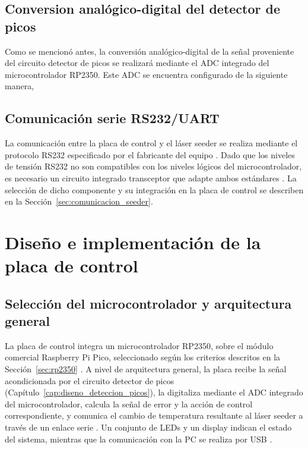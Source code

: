 \section {Conversion analógico-digital del detector de picos}
\label{sec:conversion_adc}

Como se mencionó antes, la conversión analógico-digital de la señal proveniente del circuito detector de picos se realizará mediante el ADC integrado del microcontrolador RP2350. Este ADC se encuentra configurado de la siguiente manera,

\section{Comunicaci\'on serie RS232/UART}
\label{sec:rs232_uart}

La comunicaci\'on entre la placa de control y el l\'aser seeder se
realiza mediante el protocolo RS232 especificado por el fabricante del
equipo \cite{informeMarzo2026}. Dado que los niveles de tensi\'on RS232
no son compatibles con los niveles l\'ogicos del microcontrolador, es
necesario un circuito integrado transceptor que adapte ambos est\'andares
\cite{sat2026}. La selecci\'on de dicho componente y su integraci\'on en
la placa de control se describen en la
Secci\'on~\ref{sec:comunicacion_seeder}.





\chapter{Dise\~no e implementaci\'on de la placa de control}
\label{cap:placa_control}

\section{Selecci\'on del microcontrolador y arquitectura general}
\label{sec:arquitectura_general}

La placa de control integra un microcontrolador RP2350, sobre el
m\'odulo comercial Raspberry Pi Pico, seleccionado seg\'un los criterios
descritos en la Secci\'on~\ref{sec:rp2350} \cite{informeEneFeb2026,kicad_hsrl}.
A nivel de arquitectura general, la placa recibe la se\~nal
acondicionada por el circuito detector de picos (Cap\'itulo~\ref{cap:diseno_deteccion_picos}),
la digitaliza mediante el ADC integrado del microcontrolador, calcula la
se\~nal de error y la acci\'on de control correspondiente, y comunica el
cambio de temperatura resultante al l\'aser seeder a trav\'es de un
enlace serie \cite{sat2026}. Un conjunto de LEDs y un display indican el
estado del sistema, mientras que la comunicaci\'on con la PC se realiza
por USB \cite{sat2026}.

